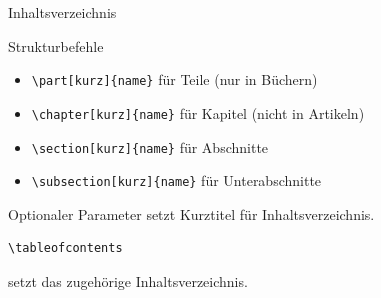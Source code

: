 \begin{Frame}[fragile]{Inhaltsverzeichnis}
  \begin{Block}{Strukturbefehle}
    \begin{itemize}
      \item \lstinline-\part[kurz]{name}- für Teile (nur in Büchern)
      \item \lstinline-\chapter[kurz]{name}- für Kapitel (nicht in Artikeln)
      \item \lstinline-\section[kurz]{name}- für Abschnitte
      \item \lstinline-\subsection[kurz]{name}- für Unterabschnitte
    \end{itemize}
  \end{Block}
  Optionaler Parameter setzt Kurztitel für Inhaltsverzeichnis.

  \xxx

  \begin{lstlisting}[gobble=4]
    \tableofcontents
  \end{lstlisting}
  setzt das zugehörige Inhaltsverzeichnis.
\end{Frame}

